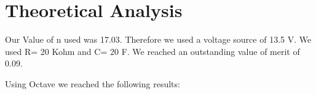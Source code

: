 \section{Theoretical Analysis}
\label{sec:analysis}

Our Value of n used was 17.03.
Therefore we used a voltage source of 13.5 V.
We used R= 20 Kohm and C= 20 F.
We reached an outstanding value of merit of 0.09.


Using Octave we reached the following results: